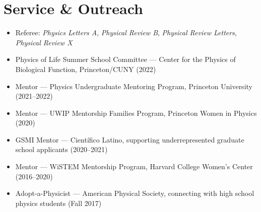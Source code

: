 \documentclass[11pt, letterpaper]{article}
\begin{document}
\section{Service \& Outreach}

\begin{itemize}
  \item Referee: \textit{Physics Letters A}, \textit{Physical Review B},
        \textit{Physical Review Letters}, \textit{Physical Review X}
  \item Physics of Life Summer School Committee — Center for the Physics of
        Biological Function, Princeton/CUNY (2022)
  \item Mentor — Physics Undergraduate Mentoring Program, Princeton University
        (2021–2022)
  \item Mentor — UWIP Mentorship Families Program, Princeton Women in Physics (2020)
  \item GSMI Mentor — Científico Latino, supporting underrepresented graduate school
        applicants (2020–2021)
  \item Mentor — WiSTEM Mentorship Program, Harvard College Women's Center
        (2016–2020)
  \item Adopt-a-Physicist — American Physical Society, connecting with high school
        physics students (Fall 2017)
\end{itemize}
\end{document}
